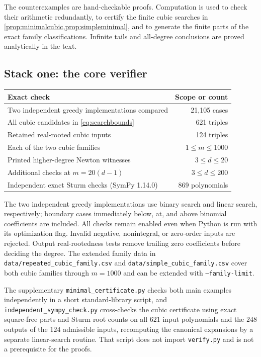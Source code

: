 \documentclass[11pt,letterpaper]{article}
\numberwithin{equation}{section}
\theoremstyle{definition}
\theoremstyle{remark}
\begin{document}
The counterexamples are hand-checkable proofs. Computation is used to
check their arithmetic redundantly, to certify the finite cubic searches in
\cref{prop:minimalcubic,prop:simpleminimal}, and to generate the finite parts
of the exact family classifications. Infinite tails and all-degree conclusions
are proved analytically in the text.

\subsection{Stack one: the core verifier}

\begin{center}
\begin{tabular}{@{}p{}r@{}}
\toprule
Exact check & Scope or count\\
\midrule
Two independent greedy implementations compared & 21,105 cases\\
All cubic candidates in \eqref{eq:searchbounds} & 621 triples\\
Retained real-rooted cubic inputs & 124 triples\\
Each of the two cubic families & $1\le m\le1000$\\
Printed higher-degree Newton witnesses & $3\le d\le20$\\
Additional checks at $m=20(d-1)$ & $3\le d\le200$\\
Independent exact Sturm checks (SymPy 1.14.0) & 869 polynomials\\
\bottomrule
\end{tabular}
\end{center}

The two independent greedy implementations use binary search and linear
search, respectively; boundary cases immediately below, at, and above binomial
coefficients are included. All checks remain enabled even when Python is
run with its optimization flag. Invalid negative, nonintegral, or
zero-order inputs are rejected. Output real-rootedness tests remove
trailing zero coefficients before deciding the degree. The extended family
data in \texttt{data/repeated\_cubic\_family.csv} and
\texttt{data/simple\_cubic\_family.csv} cover both cubic families through
$m=1000$ and can be extended with \texttt{--family-limit}.

The supplementary \texttt{minimal\_certificate.py} checks both main
examples independently in a short standard-library script, and
\texttt{independent\_sympy\_check.py} cross-checks the cubic certificate using
exact square-free parts and Sturm root counts on all $621$ input polynomials
and the $248$ outputs of the $124$ admissible inputs, recomputing the
canonical expansions by a separate linear-search routine. That script does not
import \texttt{verify.py} and is not a prerequisite for the proofs.
\end{document}
